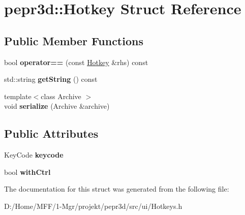 \hypertarget{structpepr3d_1_1_hotkey}{}\section{pepr3d\+::Hotkey Struct Reference}
\label{structpepr3d_1_1_hotkey}
\subsection*{Public Member Functions}
\begin{DoxyCompactItemize}
\item 
\mbox{\label{structpepr3d_1_1_hotkey_aa8b6805656f8ae9ac5782f7b71c42592}} 
bool {\bfseries operator==} (const \mbox{\hyperlink{structpepr3d_1_1_hotkey}{Hotkey}} \&rhs) const
\item 
\mbox{\label{structpepr3d_1_1_hotkey_a6a860b86dc3245d9b55f1c14773d828a}} 
std\+::string {\bfseries get\+String} () const
\item 
\mbox{\label{structpepr3d_1_1_hotkey_abcadab8376d18a77e5bb7459274741e9}} 
{\footnotesize template$<$class Archive $>$ }\\void {\bfseries serialize} (Archive \&archive)
\end{DoxyCompactItemize}
\subsection*{Public Attributes}
\begin{DoxyCompactItemize}
\item 
\mbox{\label{structpepr3d_1_1_hotkey_a2345b58eac22b51f0dacb29f38e2e68a}} 
Key\+Code {\bfseries keycode}
\item 
\mbox{\label{structpepr3d_1_1_hotkey_ae05f8b76c074b47b0c1ccd79bf105760}} 
bool {\bfseries with\+Ctrl}
\end{DoxyCompactItemize}


The documentation for this struct was generated from the following file\+:\begin{DoxyCompactItemize}
\item 
D\+:/\+Home/\+M\+F\+F/1-\/\+Mgr/projekt/pepr3d/src/ui/Hotkeys.\+h\end{DoxyCompactItemize}
